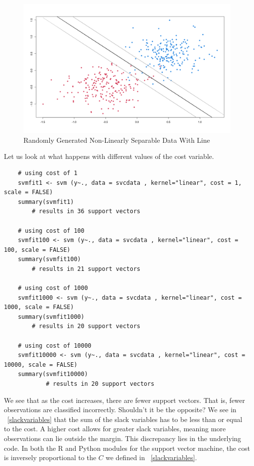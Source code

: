 \documentclass[12pt]{article}
\begin{document}
\begin{figure}[ht]
    \centering
    \includegraphics[width=5in]{Figures/svc_data_w_hyperplanes.png}
    \caption{Randomly Generated Non-Linearly Separable Data With Line}
    \label{fig_svc_data_w_hyperplanes}
\end{figure}

Let us look at what happens with different values of the cost variable.

\begin{verbatim}
    # using cost of 1
    svmfit1 <- svm (y~., data = svcdata , kernel="linear", cost = 1, scale = FALSE)
    summary(svmfit1)
        # results in 36 support vectors
    
    # using cost of 100
    svmfit100 <- svm (y~., data = svcdata , kernel="linear", cost = 100, scale = FALSE)
    summary(svmfit100)
        # results in 21 support vectors
        
    # using cost of 1000
    svmfit1000 <- svm (y~., data = svcdata , kernel="linear", cost = 1000, scale = FALSE)
    summary(svmfit1000)
        # results in 20 support vectors
    
    # using cost of 10000
    svmfit10000 <- svm (y~., data = svcdata , kernel="linear", cost = 10000, scale = FALSE)
    summary(svmfit10000)
            # results in 20 support vectors
\end{verbatim}

We see that as the cost increases, there are fewer support vectors. That is, fewer observations are classified incorrectly. Shouldn't it be the opposite? We see in ~\ref{slackvariables} that the sum of the slack variables has to be less than or equal to the cost. A higher cost allows for greater slack variables, meaning more observations can lie outside the margin. This discrepancy lies in the underlying code. In both the R and Python modules for the support vector machine, the cost is inversely proportional to the \(C\) we defined in ~\ref{slackvariables}.
\end{document}
